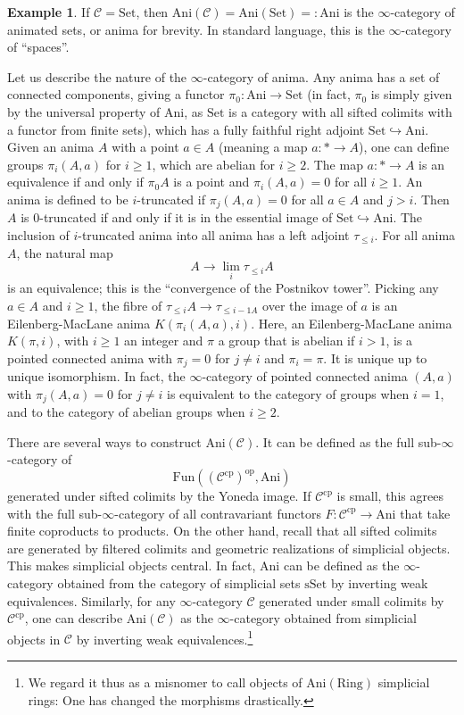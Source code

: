 \documentclass[11pt]{amsbook}
\numberwithin{equation}{section}
\numberwithin{theorem}{section}
\theoremstyle{definition}
\newtheorem{example}[theorem]{Example}
\begin{document}
\begin{example} If $\mathcal C=\mathrm{Set}$, then $\mathrm{Ani}(\mathcal C)=\mathrm{Ani}(\mathrm{Set})=:\mathrm{Ani}$ is the $\infty$-category of animated sets, or anima for brevity. In standard language, this is the $\infty$-category of ``spaces''.

Let us describe the nature of the $\infty$-category of anima. Any anima has a set of connected components, giving a functor $\pi_0:\mathrm{Ani}\to \mathrm{Set}$ (in fact, $\pi_0$ is simply given by the universal property of $\mathrm{Ani}$, as $\mathrm{Set}$ is a category with all sifted colimits with a functor from finite sets), which has a fully faithful right adjoint $\mathrm{Set}\hookrightarrow \mathrm{Ani}$. Given an anima $A$ with a point $a\in A$ (meaning a map $a: \ast\to A$), one can define groups $\pi_i(A,a)$ for $i\geq 1$, which are abelian for $i\geq 2$. The map $a: \ast\to A$ is an equivalence if and only if $\pi_0 A$ is a point and $\pi_i(A,a)=0$ for all $i\geq 1$. An anima is defined to be $i$-truncated if $\pi_j(A,a)=0$ for all $a\in A$ and $j>i$. Then $A$ is $0$-truncated if and only if it is in the essential image of $\mathrm{Set}\hookrightarrow \mathrm{Ani}$. The inclusion of $i$-truncated anima into all anima has a left adjoint $\tau_{\leq i}$. For all anima $A$, the natural map
\[
A\to \lim_i \tau_{\leq i} A
\]
is an equivalence; this is the ``convergence of the Postnikov tower''. Picking any $a\in A$ and $i\geq 1$, the fibre of $\tau_{\leq i} A\to \tau_{\leq {i-1} A}$ over the image of $a$ is an Eilenberg-MacLane anima $K(\pi_i(A,a),i)$. Here, an Eilenberg-MacLane anima $K(\pi,i)$, with $i\geq 1$ an integer and $\pi$ a group that is abelian if $i>1$, is a pointed connected anima with $\pi_j=0$ for $j\neq i$ and $\pi_i = \pi$. It is unique up to unique isomorphism. In fact, the $\infty$-category of pointed connected anima $(A,a)$ with $\pi_j(A,a)=0$ for $j\neq i$ is equivalent to the category of groups when $i=1$, and to the category of abelian groups when $i\geq 2$.
\end{example}

There are several ways to construct $\mathrm{Ani}(\mathcal C)$. It can be defined as the full sub-$\infty$-category of
\[
\mathrm{Fun}((\mathcal C^{\mathrm{cp}})^{\mathrm{op}},\mathrm{Ani})
\]
generated under sifted colimits by the Yoneda image. If $\mathcal C^{\mathrm{cp}}$ is small, this agrees with the full sub-$\infty$-category of all contravariant functors $F: \mathcal C^{\mathrm{cp}}\to \mathrm{Ani}$ that take finite coproducts to products. On the other hand, recall that all sifted colimits are generated by filtered colimits and geometric realizations of simplicial objects. This makes simplicial objects central. In fact, $\mathrm{Ani}$ can be defined as the $\infty$-category obtained from the category of simplicial sets $\mathrm{sSet}$ by inverting weak equivalences. Similarly, for any $\infty$-category $\mathcal C$ generated under small colimits by $\mathcal C^{\mathrm{cp}}$, one can describe $\mathrm{Ani}(\mathcal C)$ as the $\infty$-category obtained from simplicial objects in $\mathcal C$ by inverting weak equivalences.\footnote{We regard it thus as a misnomer to call objects of $\mathrm{Ani}(\mathrm{Ring})$ simplicial rings: One has changed the morphisms drastically.}
\end{document}
